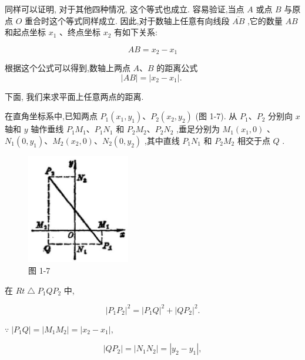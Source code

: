 \documentclass[lang=cn,newtx,10pt,scheme=chinese]{elegantbook}
\begin{document}
同样可以证明, 对于其他四种情况, 这个等式也成立. 容易验证,当点 \(A\) 或点 \(B\) 与原点 \(O\) 重合时这个等式同样成立. 因此,对于数轴上任意有向线段 \(\overline{AB}\) ,它的数量 \({AB}\) 和起点坐标 \({x}_{1}\) 、终点坐标 \({x}_{2}\) 有如下关系:

\[
    {AB} = {x}_{2} - {x}_{1}
\]
\begin{corollary}[数轴两点的距离公式]
根据这个公式可以得到,数轴上两点 \(A\text{、}B\) 的距离公式
\[
  \left| {AB}\right| = \left| {{x}_{2} - {x}_{1}}\right| \text{. }
\]
\end{corollary}
下面, 我们来求平面上任意两点的距离.

在直角坐标系中,已知两点 \({P}_{1}\left( {{x}_{1},{y}_{1}}\right) \text{、}{P}_{2}\left( {{x}_{2},{y}_{2}}\right)\) (图 1-7). 从 \({P}_{1}\text{、}{P}_{2}\) 分别向 \(x\) 轴和 \(y\) 轴作垂线 \({P}_{1}{M}_{1}\text{、}{P}_{1}{N}_{1}\) 和 \({P}_{2}{M}_{2}\text{、}{P}_{2}{N}_{2}\) ,垂足分别为 \({M}_{1}\left( {{x}_{1},0}\right)\) 、 \({N}_{1}\left( {0,{y}_{1}}\right) \text{、}{M}_{2}\left( {{x}_{2},0}\right) \text{、}{N}_{2}\left( {0,{y}_{2}}\right)\) ,其中直线 \({P}_{1}{N}_{1}\) 和 \({P}_{2}{M}_{2}\) 相交于点 \(Q\) .

\begin{figure}[h]
  \centering
  \includegraphics[max width=0.4\textwidth]{images/01912cc2-ffb6-728e-9ae7-b113ff05c64b_10_261177.jpg}
  \caption{图 1-7}
\end{figure}



在 \({Rt}\bigtriangleup {P}_{1}Q{P}_{2}\) 中,

\[
    {\left| {P}_{1}{P}_{2}\right| }^{2} = {\left| {P}_{1}Q\right| }^{2} + {\left| Q{P}_{2}\right| }^{2}.
\]

\(\because \;\left| {{P}_{1}Q}\right| = \left| {{M}_{1}{M}_{2}}\right| = \left| {{x}_{2} - {x}_{1}}\right| ,\)

\[
  \left| {Q{P}_{2}}\right| = \left| {{N}_{1}{N}_{2}}\right| = \left| {{y}_{2} - {y}_{1}}\right| ,
\]
\end{document}
